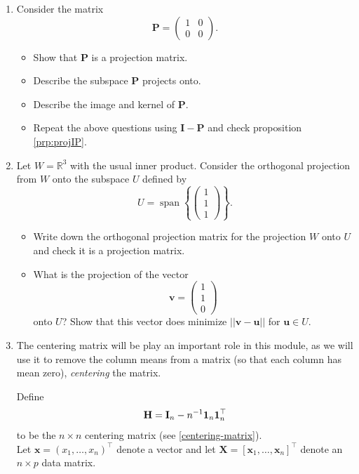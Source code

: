\documentclass[
]{book}
\providecommand{\tightlist}{%
  \setlength{\itemsep}{0pt}\setlength{\parskip}{0pt}}
\theoremstyle{definition}
\theoremstyle{definition}
\theoremstyle{definition}
\theoremstyle{definition}
\theoremstyle{remark}
\begin{document}
\begin{enumerate}
\def\labelenumi{\arabic{enumi}.}
\setcounter{enumi}{4}
\item
  Consider the matrix \[\mathbf P=\left( \begin{array}{cc}1&0\\
  0&0\end{array}\right).\]

  \begin{itemize}
  \tightlist
  \item
    Show that \(\mathbf P\) is a projection matrix.
  \item
    Describe the subspace \(\mathbf P\) projects onto.
  \item
    Describe the image and kernel of \(\mathbf P\).
  \item
    Repeat the above questions using \(\mathbf I-\mathbf P\) and check proposition \ref{prp:projIP}.
  \end{itemize}
\item
  Let \(W=\mathbb{R}^3\) with the usual inner product.
  Consider the orthogonal projection from \(W\) onto the subspace \(U\) defined by
  \[U=\operatorname{span}\left\{\left(\begin{array}{c} 1\\1\\1\end{array}\right)\right\}.\]

  \begin{itemize}
  \tightlist
  \item
    Write down the orthogonal projection matrix for the projection \(W\) onto \(U\) and check it is a projection matrix.
  \item
    What is the projection of the vector \[\mathbf v=\left(\begin{array}{c} 1\\1\\0\end{array}\right)\]
    onto \(U\)? Show that this vector does minimize \(||\mathbf v-\mathbf u||\) for \(\mathbf u\in U\).
  \end{itemize}
\item
  The centering matrix will be play an important role in this module, as we will use it to remove the column means from a matrix (so that each column has mean zero), \emph{centering} the matrix.

  Define \[\mathbf H=\mathbf I_n - n^{-1}{\bf 1}_n {\bf 1}_n^\top\] to be the \(n \times n\) centering matrix (see \ref{centering-matrix}).\\
  Let \(\mathbf x=(x_1, \ldots , x_n)^\top\) denote a vector and let \(\mathbf X=[\mathbf x_1 ,\ldots , \mathbf x_n]^\top\) denote an \(n \times p\) data matrix.


\end{enumerate}
\end{document}
